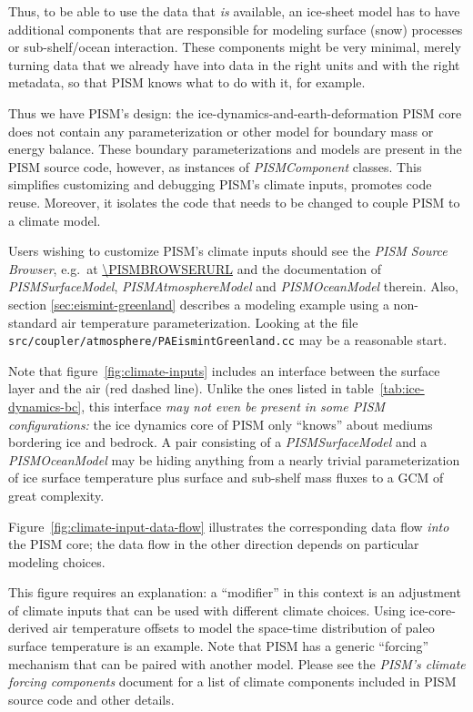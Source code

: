 \documentclass[titlepage,letterpaper,final]{scrartcl}
\begin{document}
Thus, to be able to use the data that \emph{is} available, an ice-sheet model has to
have additional components that are responsible for modeling surface (snow)
processes or sub-shelf/ocean interaction.  These components might be very minimal, merely turning data that we already have into data in the right units and with the right metadata, so that PISM knows what to do with it, for example.

Thus we have PISM's design: the ice-dynamics-and-earth-deformation PISM
core does not contain any parameterization or other model for boundary mass or
energy balance.  These boundary parameterizations and models are present in the PISM source code, however, as instances of \emph{PISMComponent} classes.  This simplifies customizing and debugging PISM's climate
inputs, promotes code reuse.  Moreover, it isolates the code that needs to be changed to
couple PISM to a climate model.

Users wishing to customize PISM's climate inputs should see the \emph{PISM
  Source Browser}, e.g.~at
\url{\PISMBROWSERURL} and the documentation
of \emph{PISMSurfaceModel}, \emph{PISMAtmosphereModel} and
\emph{PISMOceanModel} therein.  Also, section \ref{sec:eismint-greenland} describes a
modeling example using a non-standard air temperature parameterization. Looking
at the file \texttt{src/coupler/atmosphere/PAEismintGreenland.cc} may be a reasonable
start.

Note that figure~\ref{fig:climate-inputs} includes an interface between the surface layer and the air (red dashed line).
Unlike the ones listed in table~\ref{tab:ice-dynamics-bc}, this interface
\emph{may not even be present in some PISM configurations:} the ice dynamics
core of PISM only ``knows'' about mediums bordering ice and bedrock. A pair
consisting of a \emph{PISMSurfaceModel} and a \emph{PISMOceanModel} may be
hiding anything from a nearly trivial parameterization of ice surface
temperature plus surface and sub-shelf mass fluxes to a GCM of great
complexity.

Figure~\ref{fig:climate-input-data-flow} illustrates the corresponding data
flow \emph{into} the PISM core; the data flow in the other direction depends on
particular modeling choices.

This figure requires an explanation: a ``modifier'' in this context is an
adjustment of climate inputs that can be used with different climate
choices.  Using ice-core-derived air temperature offsets to model the
space-time distribution of paleo surface temperature is an example.  Note that
PISM has a generic ``forcing'' mechanism that can be paired with another model.
Please see the \emph{PISM's climate forcing components} document for
a list of climate components included in PISM source code and other details.
\end{document}
